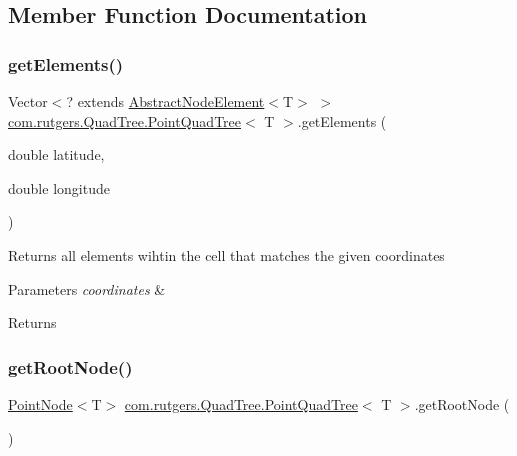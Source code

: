 \subsection{Member Function Documentation}
\mbox{\label{classcom_1_1rutgers_1_1QuadTree_1_1PointQuadTree_a9968a70d79ddfe49dc2dac031389648f}} 
\subsubsection{\texorpdfstring{get\+Elements()}{getElements()}}
{\footnotesize\ttfamily Vector$<$? extends \hyperlink{classcom_1_1rutgers_1_1QuadTree_1_1AbstractNodeElement}{Abstract\+Node\+Element}$<$T$>$ $>$ \hyperlink{classcom_1_1rutgers_1_1QuadTree_1_1PointQuadTree}{com.\+rutgers.\+Quad\+Tree.\+Point\+Quad\+Tree}$<$ T $>$.get\+Elements (\begin{DoxyParamCaption}\item[{double}]{latitude,  }\item[{double}]{longitude }\end{DoxyParamCaption})}

Returns all elements wihtin the cell that matches the given coordinates


\begin{DoxyParams}{Parameters}
{\em coordinates} & \\
\hline
\end{DoxyParams}
\begin{DoxyReturn}{Returns}

\end{DoxyReturn}
\mbox{\label{classcom_1_1rutgers_1_1QuadTree_1_1PointQuadTree_a7038d1d0c8f55c00b38bbd440c31e9aa}} 
\subsubsection{\texorpdfstring{get\+Root\+Node()}{getRootNode()}}
{\footnotesize\ttfamily \hyperlink{classcom_1_1rutgers_1_1QuadTree_1_1PointNode}{Point\+Node}$<$T$>$ \hyperlink{classcom_1_1rutgers_1_1QuadTree_1_1PointQuadTree}{com.\+rutgers.\+Quad\+Tree.\+Point\+Quad\+Tree}$<$ T $>$.get\+Root\+Node (\begin{DoxyParamCaption}{ }\end{DoxyParamCaption})}

